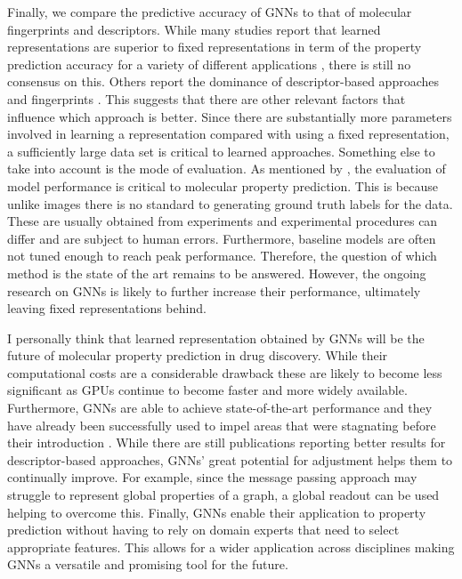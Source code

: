 Finally, we compare the predictive accuracy of GNNs to that of molecular fingerprints and descriptors. While many studies report that learned representations are superior to fixed representations in term of the property prediction accuracy for a variety of different applications \citep{wu2018moleculenet,yangMPP, korolev}, there is still no consensus on this. Others report the dominance of descriptor-based approaches and fingerprints \citep{mayr, jiang}. This suggests that there are other relevant factors that influence which approach is better. Since there are substantially more parameters involved in learning a representation compared with using a fixed representation, a sufficiently large data set is critical to learned approaches. Something else to take into account is the mode of evaluation. As mentioned by \cite{SHEN201929}, the evaluation of model performance is critical to molecular property prediction. This is because unlike images there is no standard to generating ground truth labels for the data. These are usually obtained from experiments and experimental procedures can differ and are subject to human errors. Furthermore, baseline models are often not tuned enough to reach peak performance. Therefore, the question of which method is the state of the art remains to be answered. However, the ongoing research on GNNs is likely to further increase their performance, ultimately leaving fixed representations behind.


I personally think that learned representation obtained by GNNs will be the future of molecular property prediction in drug discovery. While their computational costs are a considerable drawback these are likely to become less significant as GPUs continue to become faster and more widely available. Furthermore, GNNs are able to achieve state-of-the-art performance and they have already been successfully used to impel areas that were stagnating before their introduction \citep{STOKES2020688}. While there are still publications reporting better results for descriptor-based approaches, GNNs' great potential for adjustment helps them to continually improve. For example, since the message passing approach may struggle to represent global properties of a graph, a global readout can be used helping to overcome this. Finally, GNNs enable their application to property prediction without having to rely on domain experts that need to select appropriate features. This allows for a wider application across disciplines making GNNs a versatile and promising tool for the future. 

